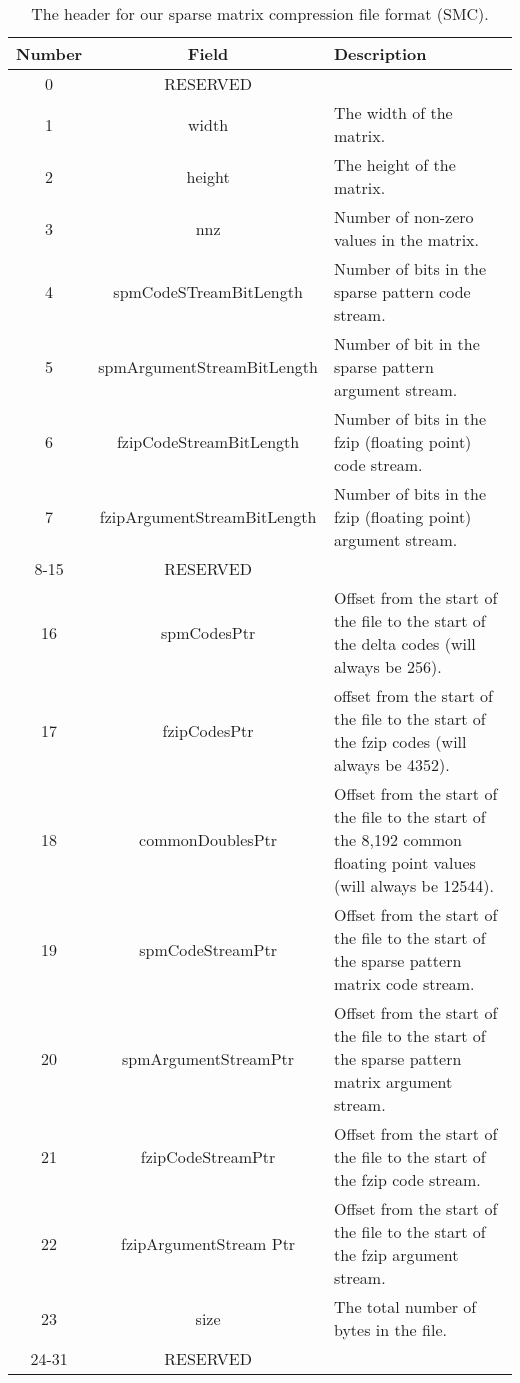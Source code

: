 \begin{table}
    \centering
    \caption{The header for our sparse matrix compression file format (SMC).}
    \label{tbl:header}
    \begin{tabular}{|ccm{6cm}|}
        \hline
        Number & Field & Description\\
        \hline
        0 & RESERVED & \\
        \hline
        1 & width & The width of the matrix.\\
        \hline
        2 & height & The height of the matrix.\\
        \hline
        3 & nnz & Number of non-zero values in the matrix.\\
        \hline
        4 & spmCodeSTreamBitLength & Number of bits in the sparse pattern code stream.\\
        \hline
        5 & spmArgumentStreamBitLength & Number of bit in the sparse pattern argument stream.\\
        \hline
        6 & fzipCodeStreamBitLength & Number of bits in the fzip (floating point) code stream.\\
        \hline
        7 & fzipArgumentStreamBitLength & Number of bits in the fzip (floating point) argument stream.\\
        \hline
        8-15 & RESERVED & \\
        \hline
        16 & spmCodesPtr & Offset from the start of the file to the start of the delta codes (will always be 256).\\
        \hline
        17 & fzipCodesPtr & offset from the start of the file to the start of the fzip codes (will always be 4352).\\
        \hline
        18 & commonDoublesPtr & Offset from the start of the file to the start of the 8,192 common floating point values (will always be 12544).\\
        \hline
        19 & spmCodeStreamPtr & Offset from the start of the file to the start of the sparse pattern matrix code stream.\\
        \hline
        20 & spmArgumentStreamPtr & Offset from the start of the file to the start of the sparse pattern matrix argument stream.\\
        \hline
        21 & fzipCodeStreamPtr & Offset from the start of the file to the start of the fzip code stream.\\
        \hline
        22 & fzipArgumentStream Ptr & Offset from the start of the file to the start of the fzip argument stream.\\
        \hline
        23 & size & The total number of bytes in the file. \\
        \hline
        24-31 & RESERVED & \\
        \hline
    \end{tabular}
\end{table}

